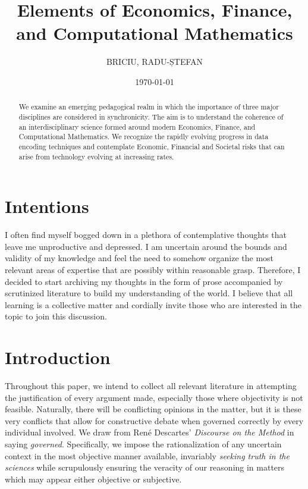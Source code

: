 \documentclass[11pt]{article}
\title{Elements of Economics, Finance, and Computational Mathematics}
\date{\today}
\author{BRICIU, RADU-ȘTEFAN}
\begin{document}
\nocite{*}
\maketitle
\newpage
\tableofcontents	
\newpage
\begin{abstract}
	\noindent
	We examine an emerging pedagogical realm in which the importance of three major disciplines are considered in synchronicity. The aim is to understand the coherence of an interdisciplinary science formed around modern Economics, Finance, and Computational Mathematics. We recognize the rapidly evolving progress in data encoding techniques and contemplate Economic, Financial and Societal risks that can arise from technology evolving at increasing rates.
\end{abstract}
\newpage

\section{Intentions}
I often find myself bogged down in a plethora of contemplative thoughts that leave me unproductive and depressed. I am uncertain around the bounds and validity of my knowledge and feel the need to somehow organize the most relevant areas of expertise that are possibly within reasonable grasp. Therefore, I decided to start archiving my thoughts in the form of prose accompanied by scrutinized literature to build my understanding of the world. I believe that all learning is a collective matter and cordially invite those who are interested in the topic to join this discussion.
\newpage

\section{Introduction}
Throughout this paper, we intend to collect all relevant literature in attempting the justification of every argument made, especially those where objectivity is not feasible. Naturally, there will be conflicting opinions in the matter, but it is these very conflicts that allow for constructive debate when governed correctly by every individual involved. We draw from René Descartes' \textit{Discourse on the Method} \cite{renedescartes_2008_a} in saying \textit{governed}. Specifically, we impose the rationalization of any uncertain context in the most objective manner available, invariably \textit{seeking truth in the sciences} while scrupulously ensuring the veracity of our reasoning in matters which may appear either objective or subjective.
\newpage


\newpage
\printbibliography
{}
\end{document}
